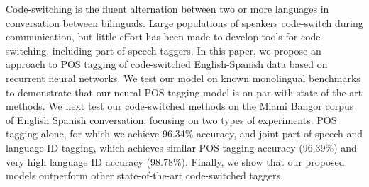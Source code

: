 Code-switching is the fluent alternation between two or more languages in conversation between bilinguals. Large populations of speakers code-switch during communication, but little effort has been made to develop tools for code-switching, including part-of-speech taggers. In this paper, we propose an approach to POS tagging of code-switched English-Spanish data based on recurrent neural networks. We test our model on known monolingual benchmarks to demonstrate that our neural POS tagging model is on par with state-of-the-art methods. We next test our code-switched methods on the Miami Bangor corpus of English Spanish conversation, focusing on two types of experiments: POS tagging alone, for which we achieve 96.34\% accuracy, and joint part-of-speech and language ID tagging, which achieves similar POS tagging accuracy (96.39\%) and very high language ID accuracy (98.78\%). Finally, we show that our proposed models outperform other state-of-the-art code-switched taggers.
